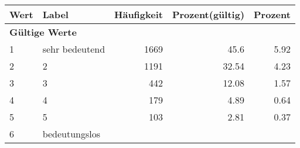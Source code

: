      \begin{longtable}{lXrrr}
     \toprule
     \textbf{Wert} & \textbf{Label} & \textbf{Häufigkeit} & \textbf{Prozent(gültig)} & \textbf{Prozent} \\
     \endhead
     \midrule
     \multicolumn{5}{l}{\textbf{Gültige Werte}}\\

     1 &
     \multicolumn{1}{X}{ sehr bedeutend   } &


       \num{1669} &
       \num[round-mode=places,round-precision=2]{45.6} &
         \num[round-mode=places,round-precision=2]{5.92} \\

     2 &
     \multicolumn{1}{X}{ 2   } &


       \num{1191} &
       \num[round-mode=places,round-precision=2]{32.54} &
         \num[round-mode=places,round-precision=2]{4.23} \\

     3 &
     \multicolumn{1}{X}{ 3   } &


       \num{442} &
       \num[round-mode=places,round-precision=2]{12.08} &
         \num[round-mode=places,round-precision=2]{1.57} \\

     4 &
     \multicolumn{1}{X}{ 4   } &


       \num{179} &
       \num[round-mode=places,round-precision=2]{4.89} &
         \num[round-mode=places,round-precision=2]{0.64} \\

     5 &
     \multicolumn{1}{X}{ 5   } &


       \num{103} &
       \num[round-mode=places,round-precision=2]{2.81} &
         \num[round-mode=places,round-precision=2]{0.37} \\

     6 &
     \multicolumn{1}{X}{ bedeutungslos   } &



\end{longtable}
